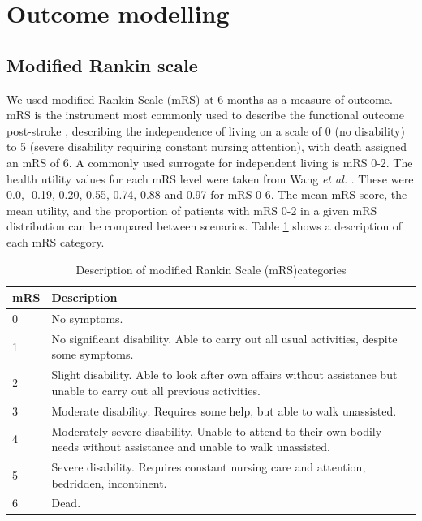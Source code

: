 
\section{Outcome modelling}

\subsection{Modified Rankin scale}

We used modified Rankin Scale (mRS) at 6 months as a measure of outcome. mRS is the instrument most commonly used to describe the functional outcome post-stroke \cite{quinn_functional_2009}, describing the independence of living on a scale of 0 (no disability) to 5 (severe disability requiring constant nursing attention), with death assigned an mRS of 6. A commonly used surrogate for independent living is mRS 0-2. The health utility values for each mRS level were taken from Wang \textit{et al.} \cite{wang_utility-weighted_2020}. These were 0.0, -0.19, 0.20, 0.55, 0.74, 0.88 and 0.97 for mRS 0-6. The mean mRS score, the mean utility, and the proportion of patients with mRS 0-2 in a given mRS distribution can be compared between scenarios. Table \ref{tab:mrs} shows a description of each mRS category.

\begin{minipage}{1.0\textwidth}  %
\begin{longtable}{p{1.2cm} p{13cm}}
\caption{Description of modified Rankin Scale (mRS)categories}\label{tab:mrs}\\
\toprule
mRS & Description \\
\midrule
0 & No symptoms. \\
1 & No significant disability. Able to carry out all usual activities, despite some symptoms.\\
2 & Slight disability. Able to look after own affairs without assistance but unable to carry out all previous activities. \\
3 & Moderate disability. Requires some help, but able to walk unassisted.\\
4 & Moderately severe disability. Unable to attend to their own bodily needs without assistance and unable to walk unassisted. \\
5 & Severe disability. Requires constant nursing care and attention,
bedridden, incontinent.\\
6 & Dead.\\
\bottomrule
\end{longtable}
\end{minipage} 



